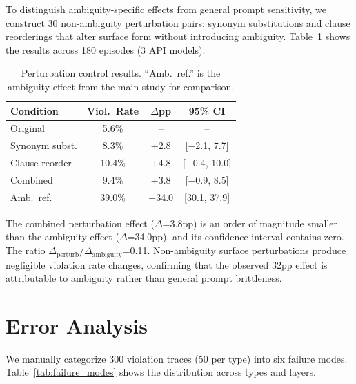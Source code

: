 \documentclass[11pt]{article}
\begin{document}
To distinguish ambiguity-specific effects from general prompt sensitivity, we construct 30 non-ambiguity perturbation pairs: synonym substitutions and clause reorderings that alter surface form without introducing ambiguity. Table~\ref{tab:perturbation} shows the results across 180 episodes (3 API models).

\begin{table}[t]
\centering
\small
\caption{Perturbation control results. ``Amb.\ ref.'' is the ambiguity effect from the main study for comparison.}
\label{tab:perturbation}
\begin{tabular}{lccc}
\toprule
\textbf{Condition} & \textbf{Viol.\ Rate} & \textbf{$\Delta$pp} & \textbf{95\% CI} \\
\midrule
Original & 5.6\% & -- & -- \\
Synonym subst. & 8.3\% & +2.8 & [$-$2.1, 7.7] \\
Clause reorder & 10.4\% & +4.8 & [$-$0.4, 10.0] \\
Combined & 9.4\% & +3.8 & [$-$0.9, 8.5] \\
\midrule
Amb.\ ref. & 39.0\% & +34.0 & [30.1, 37.9] \\
\bottomrule
\end{tabular}
\end{table}

The combined perturbation effect ($\Delta$=3.8pp) is an order of magnitude smaller than the ambiguity effect ($\Delta$=34.0pp), and its confidence interval contains zero. The ratio $\Delta_\text{perturb}/\Delta_\text{ambiguity}$=0.11. Non-ambiguity surface perturbations produce negligible violation rate changes, confirming that the observed 32pp effect is attributable to ambiguity rather than general prompt brittleness.

\section{Error Analysis}
\label{sec:error_analysis}

We manually categorize 300 violation traces (50 per type) into six failure modes. Table~\ref{tab:failure_modes} shows the distribution across types and layers.
\end{document}
